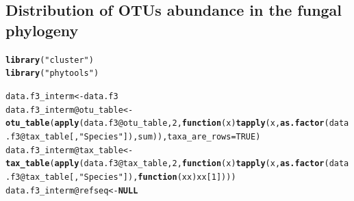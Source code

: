 \documentclass[12pt]{article}\usepackage[]{graphicx}\usepackage[]{color}
\makeatletter
\newcommand{\hlnum}[1]{\textcolor[rgb]{0.686,0.059,0.569}{#1}}%
\newcommand{\hlstr}[1]{\textcolor[rgb]{0.192,0.494,0.8}{#1}}%
\newcommand{\hlopt}[1]{\textcolor[rgb]{0,0,0}{#1}}%
\newcommand{\hlstd}[1]{\textcolor[rgb]{0.345,0.345,0.345}{#1}}%
\newcommand{\hlkwa}[1]{\textcolor[rgb]{0.161,0.373,0.58}{\textbf{#1}}}%
\newcommand{\hlkwb}[1]{\textcolor[rgb]{0.69,0.353,0.396}{#1}}%
\newcommand{\hlkwc}[1]{\textcolor[rgb]{0.333,0.667,0.333}{#1}}%
\newcommand{\hlkwd}[1]{\textcolor[rgb]{0.737,0.353,0.396}{\textbf{#1}}}%
\newenvironment{kframe}{%
 \def\at@end@of@kframe{}%
 \ifinner\ifhmode%
  \def\at@end@of@kframe{\end{minipage}}%
  \begin{minipage}{\columnwidth}%
 \fi\fi%
 \def\FrameCommand##1{\hskip\@totalleftmargin \hskip-\fboxsep
 \colorbox{shadecolor}{##1}\hskip-\fboxsep
     \hskip-\linewidth \hskip-\@totalleftmargin \hskip\columnwidth}%
 \MakeFramed {\advance\hsize-\width
   \@totalleftmargin\z@ \linewidth\hsize
   \@setminipage}}%
 {\par\unskip\endMakeFramed%
 \at@end@of@kframe}
\newenvironment{knitrout}{}{} %
\numberwithin{figure}{section}
\makeatother
\begin{document}
\subsection{Distribution of OTUs abundance in the fungal phylogeny}

\begin{knitrout}\small
{}\color{fgcolor}\begin{kframe}
\begin{alltt}
\hlkwd{library}\hlstd{(}\hlstr{"cluster"}\hlstd{)}
\hlkwd{library}\hlstd{(}\hlstr{"phytools"}\hlstd{)}
\end{alltt}


{\ttfamily\noindent\itshape\color{messagecolor}{\#\# Loading required package: maps}}

{\ttfamily\noindent\itshape\color{messagecolor}{\#\# \\\#\# Attaching package: 'maps'}}

{\ttfamily\noindent\itshape\color{messagecolor}{\#\# The following object is masked from 'package:plyr':\\\#\# \\\#\#\ \ \ \  ozone}}

{\ttfamily\noindent\itshape\color{messagecolor}{\#\# The following object is masked from 'package:cluster':\\\#\# \\\#\#\ \ \ \  votes.repub}}\begin{alltt}
\hlstd{data.f3_interm} \hlkwb{<-} \hlstd{data.f3}
\hlstd{data.f3_interm}\hlopt{@}\hlkwc{otu_table} \hlkwb{<-} \hlkwd{otu_table}\hlstd{(}\hlkwd{apply}\hlstd{(data.f3}\hlopt{@}\hlkwc{otu_table}\hlstd{,} \hlnum{2}\hlstd{,} \hlkwa{function}\hlstd{(}\hlkwc{x}\hlstd{)} \hlkwd{tapply}\hlstd{(x,} \hlkwd{as.factor}\hlstd{(data.f3}\hlopt{@}\hlkwc{tax_table}\hlstd{[,}\hlstr{"Species"}\hlstd{]), sum)),} \hlkwc{taxa_are_rows} \hlstd{=} \hlnum{TRUE}\hlstd{)}
\hlstd{data.f3_interm}\hlopt{@}\hlkwc{tax_table} \hlkwb{<-} \hlkwd{tax_table}\hlstd{(}\hlkwd{apply}\hlstd{(data.f3}\hlopt{@}\hlkwc{tax_table}\hlstd{,} \hlnum{2}\hlstd{,} \hlkwa{function}\hlstd{(}\hlkwc{x}\hlstd{)} \hlkwd{tapply}\hlstd{(x,} \hlkwd{as.factor}\hlstd{(data.f3}\hlopt{@}\hlkwc{tax_table}\hlstd{[,}\hlstr{"Species"}\hlstd{]),} \hlkwa{function}\hlstd{(}\hlkwc{xx}\hlstd{) xx[}\hlnum{1}\hlstd{])))}
\hlstd{data.f3_interm}\hlopt{@}\hlkwc{refseq} \hlkwb{<-} \hlkwa{NULL}


\end{alltt}
\end{kframe}
\end{knitrout}
\end{document}
